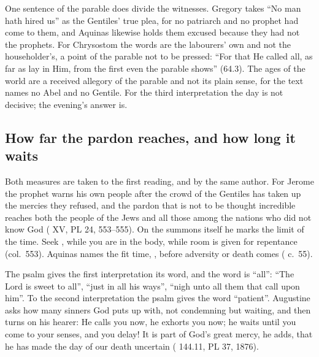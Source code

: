 One sentence of the parable does divide the witnesses. Gregory takes ``No man
hath hired us'' as the Gentiles' true plea, for no patriarch and no prophet
had come to them, and Aquinas likewise holds them excused because they had not
the prophets. For Chrysostom the words are the labourers' own and not the
householder's, a point of the parable not to be pressed: ``For that He called
all, as far as lay in Him, from the first even the parable shows'' (64.3). The
ages of the world are a received allegory of the parable and not its plain
sense, for the text names no Abel and no Gentile. For the third interpretation
the day is not decisive; the evening's answer is.

\subsection{How far the pardon reaches, and how long it waits}

Both measures are taken to the first reading, and by the same author. For
Jerome the prophet warns his own people after the crowd of the Gentiles has
taken up the mercies they refused, and the pardon that is not to be thought
incredible reaches both the people of the Jews and all those among the nations
who did not know God ( XV, PL 24, 553--555). On the summons itself he marks the
limit of the time. Seek , while you are in the body, while room is given for repentance
(col.~553). Aquinas names the fit time,
, before adversity or death comes
( c.~55).

The psalm gives the first interpretation its word, and the word is ``all'':
``The Lord is sweet to all'', ``just in all his ways'', ``nigh unto all them
that call upon him''. To the second interpretation the psalm gives the word ``patient''. Augustine asks how
many sinners God puts up with, not condemning but waiting, and then turns on
his hearer:  He calls you now, he exhorts you now; he waits
until you come to your senses, and you delay! It is part of God's great mercy,
he adds, that he has made the day of our death uncertain ( 144.11, PL 37, 1876).

